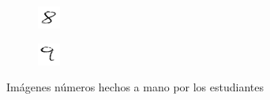 \documentclass[journal]{IEEEtran}
\begin{document}
\begin{figure}
\begin{subfigure}[b]{0.2\textwidth}
    \end{subfigure}
            \begin{subfigure}[b]{0.2\textwidth}
        \includegraphics[width=\textwidth]{h8.png}
    \end{subfigure}
            \begin{subfigure}[b]{0.2\textwidth}
        \includegraphics[width=\textwidth]{h9.png}
    \end{subfigure}
    \label{amano}
    \caption{Imágenes números hechos a mano por los estudiantes}\label{fig:animals}
\end{figure}
\end{document}
